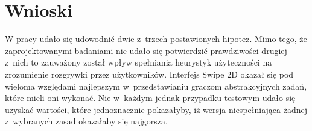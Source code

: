 \documentclass[a4paper,12pt,numbers=noenddot]{report}
\begin{document}
\chapter{Wnioski}

W pracy udało się udowodnić dwie z~trzech postawionych hipotez. Mimo tego, że zaprojektowanymi badaniami nie udało się potwierdzić prawdziwości drugiej z~nich to zauważony został wpływ spełniania heurystyk użyteczności na zrozumienie rozgrywki przez użytkowników. Interfejs Swipe 2D okazał się pod wieloma względami najlepszym w~przedstawianiu graczom abstrakcyjnych zadań, które mieli oni wykonać. Nie w~każdym jednak przypadku testowym udało się uzyskać wartości, które jednoznacznie pokazałyby, iż wersja niespełniająca żadnej z~wybranych zasad okazałaby się najgorsza. \\
\end{document}
